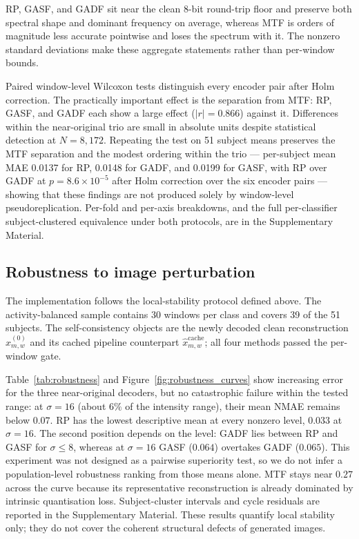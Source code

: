 \documentclass[preprint,12pt]{elsarticle}
\begin{document}
RP, GASF, and GADF sit near the clean 8-bit round-trip floor and preserve both spectral shape and dominant frequency on average, whereas MTF is orders of magnitude less accurate pointwise and loses the spectrum with it. The nonzero standard deviations make these aggregate statements rather than per-window bounds.

Paired window-level Wilcoxon tests distinguish every encoder pair after Holm correction. The practically important effect is the separation from MTF: RP, GASF, and GADF each show a large effect (\(|r|=0.866\)) against it. Differences within the near-original trio are small in absolute units despite statistical detection at \(N=8{,}172\). Repeating the test on 51 subject means preserves the MTF separation and the modest ordering within the trio --- per-subject mean MAE 0.0137 for RP, 0.0148 for GADF, and 0.0199 for GASF, with RP over GADF at \(p=8.6\times10^{-5}\) after Holm correction over the six encoder pairs --- showing that these findings are not produced solely by window-level pseudoreplication. Per-fold and per-axis breakdowns, and the full per-classifier subject-clustered equivalence under both protocols, are in the Supplementary Material.

\subsection{Robustness to image perturbation}\label{sec:results_robustness}

The implementation follows the local-stability protocol defined above. The activity-balanced sample contains 30 windows per class and covers 39 of the 51 subjects. The self-consistency objects are the newly decoded clean reconstruction \(\hat x^{(0)}_{m,w}\) and its cached pipeline counterpart \(\hat x^{\mathrm{cache}}_{m,w}\); all four methods passed the per-window gate.

Table~\ref{tab:robustness} and Figure~\ref{fig:robustness_curves} show increasing error for the three near-original decoders, but no catastrophic failure within the tested range: at \(\sigma=16\) (about \(6\%\) of the intensity range), their mean NMAE remains below \(0.07\). RP has the lowest descriptive mean at every nonzero level, \(0.033\) at \(\sigma=16\). The second position depends on the level: GADF lies between RP and GASF for \(\sigma\le8\), whereas at \(\sigma=16\) GASF (\(0.064\)) overtakes GADF (\(0.065\)). This experiment was not designed as a pairwise superiority test, so we do not infer a population-level robustness ranking from those means alone. MTF stays near \(0.27\) across the curve because its representative reconstruction is already dominated by intrinsic quantisation loss. Subject-cluster intervals and cycle residuals are reported in the Supplementary Material. These results quantify local stability only; they do not cover the coherent structural defects of generated images.
\end{document}
